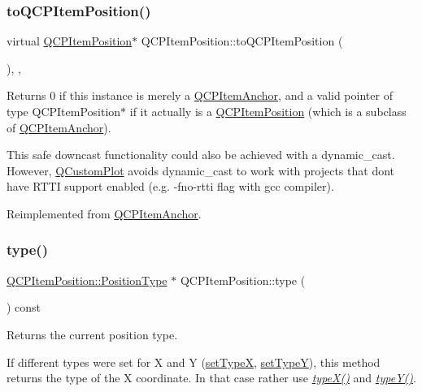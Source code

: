 \subsubsection{\texorpdfstring{to\+Q\+C\+P\+Item\+Position()}{toQCPItemPosition()}}
{\footnotesize\ttfamily virtual \hyperlink{class_q_c_p_item_position}{Q\+C\+P\+Item\+Position}$\ast$ Q\+C\+P\+Item\+Position\+::to\+Q\+C\+P\+Item\+Position (\begin{DoxyParamCaption}{ }\end{DoxyParamCaption})\hspace{0.3cm}{\ttfamily [inline]}, {\ttfamily [protected]}, {\ttfamily [virtual]}}

Returns 0 if this instance is merely a \hyperlink{class_q_c_p_item_anchor}{Q\+C\+P\+Item\+Anchor}, and a valid pointer of type Q\+C\+P\+Item\+Position$\ast$ if it actually is a \hyperlink{class_q_c_p_item_position}{Q\+C\+P\+Item\+Position} (which is a subclass of \hyperlink{class_q_c_p_item_anchor}{Q\+C\+P\+Item\+Anchor}).

This safe downcast functionality could also be achieved with a dynamic\+\_\+cast. However, \hyperlink{class_q_custom_plot}{Q\+Custom\+Plot} avoids dynamic\+\_\+cast to work with projects that don\textquotesingle{}t have R\+T\+TI support enabled (e.\+g. -\/fno-\/rtti flag with gcc compiler). 

Reimplemented from \hyperlink{class_q_c_p_item_anchor_ac54b20120669950255a63587193dbb86}{Q\+C\+P\+Item\+Anchor}.

\mbox{\label{class_q_c_p_item_position_abfd74d86bd799306ce0295ffe433bdfc}} 
\subsubsection{\texorpdfstring{type()}{type()}}
{\footnotesize\ttfamily \hyperlink{class_q_c_p_item_position_aad9936c22bf43e3d358552f6e86dbdc8}{Q\+C\+P\+Item\+Position\+::\+Position\+Type} $\ast$ Q\+C\+P\+Item\+Position\+::type (\begin{DoxyParamCaption}{ }\end{DoxyParamCaption}) const\hspace{0.3cm}{\ttfamily [inline]}}

Returns the current position type.

If different types were set for X and Y (\hyperlink{class_q_c_p_item_position_a2113b2351d6d00457fb3559a4e20c3ea}{set\+TypeX}, \hyperlink{class_q_c_p_item_position_ac2a454aa5a54c1615c50686601ec4510}{set\+TypeY}), this method returns the type of the X coordinate. In that case rather use {\itshape \hyperlink{class_q_c_p_item_position_a1415911868835701c04250566bfc681d}{type\+X()}} and {\itshape \hyperlink{class_q_c_p_item_position_ae47bac6f679c58f9e1c78dc63d56f331}{type\+Y()}}.


